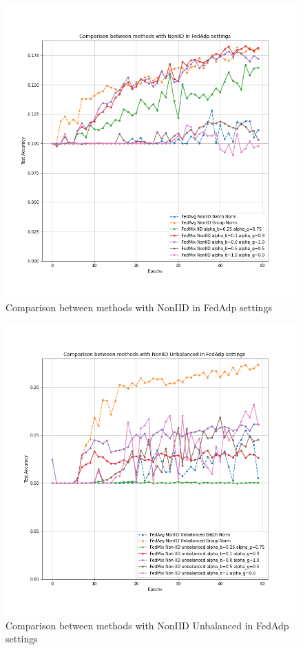 \documentclass[conference]{IEEEtran}
\begin{document}
\begin{figure}[htb]
    \centering
    \includegraphics[width=\columnwidth]{Images/Comparison between methods with NonIID in FedAdp settings.png}
    \caption{Comparison between methods with NonIID in FedAdp settings}
    \label{fig:appendix9}
\end{figure}
\begin{figure}[htb]
    \centering
    \includegraphics[width=\columnwidth]{Images/Comparison between methods with NonIID Unbalanced in FedAdp settings.png}
    \caption{Comparison between methods with NonIID Unbalanced in FedAdp settings}
    \label{fig:appendix10}
\end{figure}
\end{document}
